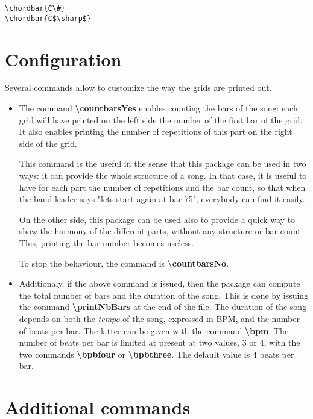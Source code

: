 \documentclass[11pt]{article}
\newcommand{\btt}{\bfseries \ttfamily }
\newcommand{\tbs}{\textbackslash{}}
\begin{document}
\begin{lstlisting}
\chordbar{C\#}
\chordbar{C$\sharp$}
\end{lstlisting}


\section{Configuration}

Several commands allow to customize the way the grids are printed out.

\begin{itemize}
\item The command {\btt \tbs countbarsYes} enables counting the bars of the song:
each grid will have printed on the left side the number of the first bar of the grid.
It also enables printing the number of repetitions of this part on the right side of the grid.

This command is the useful in the sense that this package can be used in two ways:
it can provide the whole structure of a song.
In that case, it is useful to have for each part the number of repetitions and the bar count, so that when the band leader says "lets start again at bar 75", everybody can find it easily.

On the other side, this package can be used also to provide a quick way to show the harmony of the different parts, without any structure or bar count.
This, printing the bar number becomes useless.

To stop the behaviour, the command is {\btt \tbs countbarsNo}.

\item Additionaly, if the above command is issued, then the package can compute the total number of bars and the duration of the song.
This is done by issuing the command {\btt \tbs printNbBars} at the end of the file.
The duration of the song depends on both the {\em tempo} of the song, expressed in BPM, and the number of beats per bar.
The latter can be given with the command {\btt \tbs bpm}.
The number of beats per bar is limited at present at two values, 3 or 4, with the two commands
{\btt \tbs bpbfour} or {\btt \tbs bpbthree}.
The default value is 4 beats per bar.


\end{itemize}

\section{Additional commands}
\end{document}
